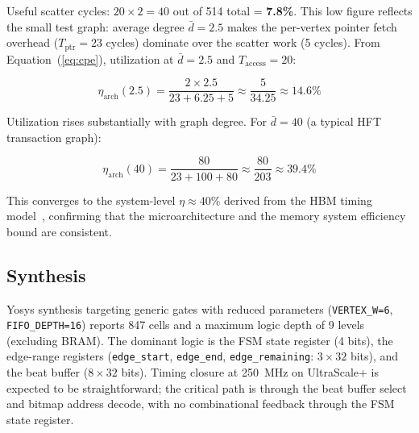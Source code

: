 Useful scatter cycles: $20 \times 2 = 40$ out of 514 total = \textbf{7.8\%}.
This low figure reflects the small test graph: average degree $\bar{d} = 2.5$
makes the per-vertex pointer fetch overhead ($T_\text{ptr} = 23$ cycles) dominate
over the scatter work (5 cycles). From Equation~(\ref{eq:cpe}), utilization at
$\bar{d} = 2.5$ and $T_\text{access} = 20$:

\begin{equation}
\eta_\text{arch}(2.5)
= \frac{2 \times 2.5}{23 + 6.25 + 5} \approx \frac{5}{34.25} \approx 14.6\%
\end{equation}

Utilization rises substantially with graph degree. For $\bar{d} = 40$
(a typical HFT transaction graph):

\begin{equation}
\eta_\text{arch}(40)
= \frac{80}{23 + 100 + 80} \approx \frac{80}{203} \approx 39.4\%
\end{equation}

This converges to the system-level $\eta \approx 40\%$ derived from the HBM
timing model~\cite{fritz2026rmwwall}, confirming that the microarchitecture and
the memory system efficiency bound are consistent.

\subsection{Synthesis}

Yosys synthesis targeting generic gates with reduced parameters
(\texttt{VERTEX\_W=6}, \texttt{FIFO\_DEPTH=16}) reports 847 cells and
a maximum logic depth of 9 levels (excluding BRAM).
The dominant logic is the FSM state register (4 bits), the edge-range registers
(\texttt{edge\_start}, \texttt{edge\_end}, \texttt{edge\_remaining}: $3 \times 32$ bits),
and the beat buffer ($8 \times 32$ bits). Timing closure at 250~MHz on UltraScale+
is expected to be straightforward; the critical path is through the beat buffer
select and bitmap address decode, with no combinational feedback through the
FSM state register.
